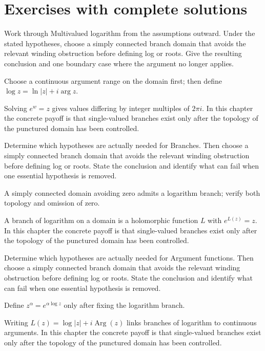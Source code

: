 \section{Exercises with complete solutions}

\begin{exercise}\label{exr:iv14-01}
Work through Multivalued logarithm from the assumptions outward. Under the stated hypotheses, choose a simply connected branch domain that avoids the relevant winding obstruction before defining log or roots. Give the resulting conclusion and one boundary case where the argument no longer applies.
\end{exercise}
\begin{hint}
Choose a continuous argument range on the domain first; then define \(\log z=\ln|z|+i\arg z\).
\end{hint}
\begin{solution}
Solving $e^w=z$ gives values differing by integer multiples of $2\pi i$. In this chapter the concrete payoff is that single-valued branches exist only after the topology of the punctured domain has been controlled.
\end{solution}

\begin{exercise}\label{exr:iv14-02}
Determine which hypotheses are actually needed for Branches. Then choose a simply connected branch domain that avoids the relevant winding obstruction before defining log or roots. State the conclusion and identify what can fail when one essential hypothesis is removed.
\end{exercise}
\begin{hint}
A simply connected domain avoiding zero admits a logarithm branch; verify both topology and omission of zero.
\end{hint}
\begin{solution}
A branch of logarithm on a domain is a holomorphic function $L$ with $e^{L(z)}=z$. In this chapter the concrete payoff is that single-valued branches exist only after the topology of the punctured domain has been controlled.
\end{solution}

\begin{exercise}\label{exr:iv14-03}
Determine which hypotheses are actually needed for Argument functions. Then choose a simply connected branch domain that avoids the relevant winding obstruction before defining log or roots. State the conclusion and identify what can fail when one essential hypothesis is removed.
\end{exercise}
\begin{hint}
Define \(z^\alpha=e^{\alpha\log z}\) only after fixing the logarithm branch.
\end{hint}
\begin{solution}
Writing $L(z)=\log|z|+i\operatorname{Arg}(z)$ links branches of logarithm to continuous arguments. In this chapter the concrete payoff is that single-valued branches exist only after the topology of the punctured domain has been controlled.
\end{solution}

